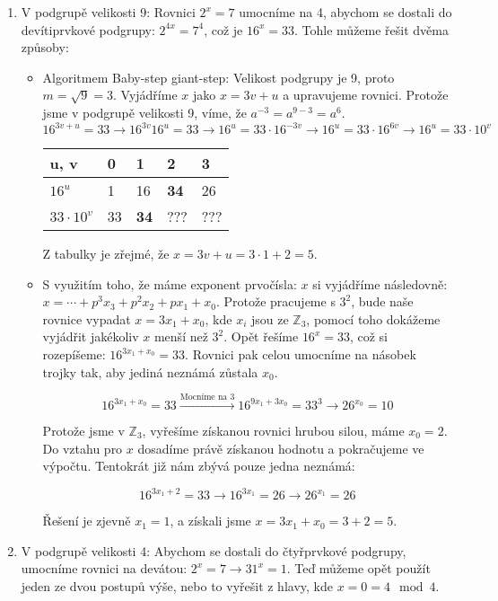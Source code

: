 \documentclass[10pt,a4paper]{article}
\begin{document}
\begin{enumerate}
\item V podgrupě velikosti 9: Rovnici $2^x = 7$ umocníme na 4, abychom se dostali do devítiprvkové podgrupy: $2^{4x} = 7^4$, což je $16^x = 33$. Tohle můžeme řešit dvěma způsoby:
\begin{itemize}
\item Algoritmem Baby-step giant-step: Velikost podgrupy je 9, proto $m = \sqrt{9} = 3$. Vyjádříme $x$ jako $x = 3v + u$ a upravujeme rovnici. Protože jsme v podgrupě velikosti 9, víme, že $a^{-3} = a^{9-3} = a^6$.
$$16^{3v+u} = 33 \xrightarrow{}16^{3v}16^u = 33 \xrightarrow{}16^u = 33\cdot 16^{-3v} \xrightarrow{} 16^u = 33\cdot 16^{6v} \xrightarrow{}16^u = 33\cdot 10^v$$

\begin{table}[h!]
\centering
\begin{tabular}{|p{1cm}|p{1cm}|p{1cm}|p{1cm}|p{1cm}|}
\hline
u, v & 0 & 1 & 2 & 3\\
\hline
\hline
$16^u$ & 1 & 16 & \textbf{34} & 26\\
\hline
$33\cdot 10^v$ & 33 & \textbf{34} & ??? & ??? \\
\hline
\end{tabular}
\end{table}

Z tabulky je zřejmé, že $x = 3v + u = 3\cdot 1 + 2 = 5$.

\item S využitím toho, že máme exponent prvočísla: $x$ si vyjádříme následovně: $x = \cdots + p^3x_3 + p^2x_2 + px_1 + x_0$. Protože pracujeme s $3^2$, bude naše rovnice vypadat $x = 3x_1 + x_0$, kde $x_i$ jsou ze $\mathbb{Z}_{3}$, pomocí toho dokážeme vyjádřit jakékoliv $x$ menší než $3^2$. Opět řešíme $16^x = 33$, což si rozepíšeme:  $16^{3x_1 + x_0} = 33$. Rovnici pak celou umocníme na násobek trojky tak, aby jediná neznámá zůstala $x_0$. 

$$ 16^{3x_1 + x_0} = 33  \xrightarrow{\text{Mocníme na 3}} 16^{9x_1 + 3x_0} = 33^3 \xrightarrow{} 26^{x_0} = 10$$

Protože jsme v $\mathbb{Z}_{3}$, vyřešíme získanou rovnici hrubou silou, máme $x_0 = 2$. Do vztahu pro $x$ dosadíme právě získanou hodnotu a pokračujeme ve výpočtu. Tentokrát již nám zbývá pouze jedna neznámá:

$$ 16^{3x_1 + 2} = 33  \xrightarrow{} 16^{3x_1} = 26 \xrightarrow{} 26^{x_1} = 26$$

Řešení je zjevně $x_1 = 1$, a získali jsme $x = 3x_1 + x_0 = 3 + 2 = 5$.
\end{itemize}
\item V podgrupě velikosti 4: Abychom se dostali do čtyřprvkové podgrupy, umocníme rovnici na devátou: $2^x = 7 \rightarrow{} 31^x = 1$. Teď můžeme opět použít jeden ze dvou postupů výše, nebo to vyřešit z hlavy, kde $x = 0 = 4 \mod 4$.
\end{enumerate}
\end{document}

